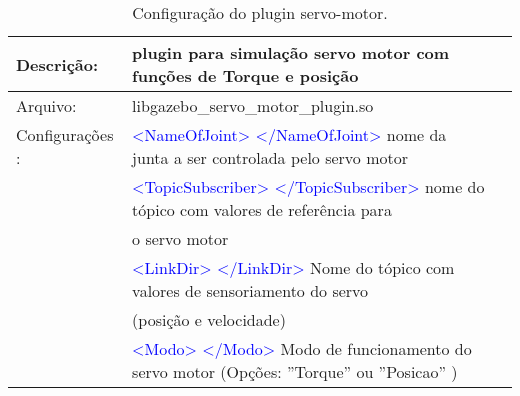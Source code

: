 		\begin{table}[h]
		\centering
		\begin{tabular}{|r|lr|}
		\hline
		\multicolumn{1}{|l|}{Descrição: } & plugin para simulação servo motor com funções de Torque e posição &         \\
		\hline
		\multicolumn{1}{|l|}{Arquivo: } & libgazebo\_servo\_motor\_plugin.so &          \\
		\hline
		\multicolumn{1}{|l|}{Configurações :} & \textcolor{blue}{<NameOfJoint> </NameOfJoint>} nome da junta a ser controlada pelo servo motor &          \\
		& \textcolor{blue}{<TopicSubscriber> </TopicSubscriber>} nome do tópico com valores de referência para &       \\
		& o servo motor &          \\
		& \textcolor{blue}{<LinkDir> </LinkDir>} Nome do tópico com valores de sensoriamento do servo  &        \\
		& (posição e velocidade) &      \\
		& \textcolor{blue}{<Modo> </Modo>} Modo de funcionamento do servo motor (Opções: ''Torque'' ou ''Posicao'' ) &        \\
		\hline
		\end{tabular}%
		\caption{Configuração do plugin servo-motor.}
		\label{tab:Servo}%
		\end{table}%
			
